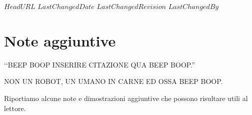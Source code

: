 \svnidlong
{$HeadURL$}
{$LastChangedDate$}
{$LastChangedRevision$}
{$LastChangedBy$}

\chapter{Note aggiuntive}

\begin{introduction}
‘‘BEEP BOOP INSERIRE CITAZIONE QUA BEEP BOOP.''
\begin{flushright}
	\textsc{NON UN ROBOT,} UN UMANO IN CARNE ED OSSA BEEP BOOP.
\end{flushright}
\end{introduction}

\noindent Riportiamo alcune note e dimostrazioni aggiuntive che possono risultare utili al lettore.

